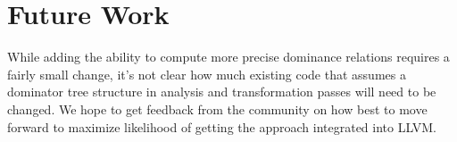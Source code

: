 \documentclass[a4paper,twocolumn]{article}
\begin{document}
\section*{Future Work}
While adding the ability to compute more precise dominance relations requires
a fairly small change, it's not clear how much existing code that assumes a 
dominator tree structure in analysis and transformation passes will need to be
changed. We hope to get feedback from the community on how best to move forward
to maximize likelihood of getting the approach integrated into LLVM. 
\end{document}

